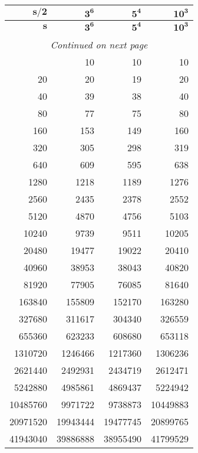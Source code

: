 \documentclass[a4paper,10pt]{article}
\theoremstyle{plain} %
\theoremstyle{definition}
\theoremstyle{remark}
\begin{document}
\begin{center}
\begin{longtable}{r r r r}
\multicolumn{1}{r}{$\mathbf{s/2}$}&
\multicolumn{1}{r}{$\mathbf{3^6}$}&
\multicolumn{1}{r}{$\mathbf{5^4}$}&
\multicolumn{1}{r}{$\mathbf{10^3}$} \\
\endfirsthead
%
\multicolumn{1}{r}{$\mathbf{s}$}&
\multicolumn{1}{r}{$\mathbf{3^6}$}&
\multicolumn{1}{r}{$\mathbf{5^4}$}&
\multicolumn{1}{r}{$\mathbf{10^3}$} \\
\endhead
\rule{0pt}{1ex}\\
\multicolumn{4}{c}{{\footnotesize{\textit{Continued on next page}}}} \\
\endfoot
\endlastfoot
10       & 10       & 10       & 10       \\
20       & 20       & 19       & 20       \\
40       & 39       & 38       & 40       \\
80       & 77       & 75       & 80       \\
160      & 153      & 149      & 160      \\
320      & 305      & 298      & 319      \\
640      & 609      & 595      & 638      \\
1280     & 1218     & 1189     & 1276     \\
2560     & 2435     & 2378     & 2552     \\
5120     & 4870     & 4756     & 5103     \\
10240    & 9739     & 9511     & 10205    \\
20480    & 19477    & 19022    & 20410    \\
40960    & 38953    & 38043    & 40820    \\
81920    & 77905    & 76085    & 81640    \\
163840   & 155809   & 152170   & 163280   \\
327680   & 311617   & 304340   & 326559   \\
655360   & 623233   & 608680   & 653118   \\
1310720  & 1246466  & 1217360  & 1306236  \\
2621440  & 2492931  & 2434719  & 2612471  \\
5242880  & 4985861  & 4869437  & 5224942  \\
10485760 & 9971722  & 9738873  & 10449883 \\
20971520 & 19943444 & 19477745 & 20899765 \\
41943040 & 39886888 & 38955490 & 41799529
\end{longtable}
\label{tab:baserelations}
\end{center}
\end{document}
